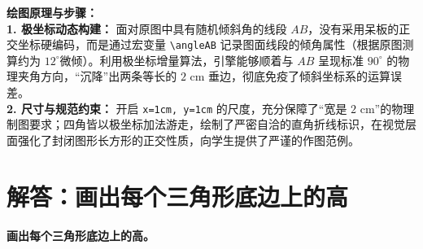 \vspace{0.4cm}
{\small\color{blue!70!black}
\textbf{绘图原理与步骤：}\\
\textbf{1. 极坐标动态构建：} 面对原图中具有随机倾斜角的线段 $AB$，没有采用呆板的正交坐标硬编码，而是通过宏变量 \texttt{\textbackslash angleAB} 记录图面线段的倾角属性（根据原图测算约为 $12^\circ$微倾）。利用极坐标增量算法，引擎能够顺着与 $AB$ 呈现标准 $90^\circ$ 的物理夹角方向，“沉降”出两条等长的 $2\text{ cm}$ 垂边，彻底免疫了倾斜坐标系的运算误差。\\
\textbf{2. 尺寸与规范约束：} 开启 \texttt{x=1cm, y=1cm} 的尺度，充分保障了“宽是 $2\text{ cm}$”的物理制图要求；四角皆以极坐标加法游走，绘制了严密自洽的直角折线标识，在视觉层面强化了封闭图形长方形的正交性质，向学生提供了严谨的作图范例。
}

\newpage




\section{解答：画出每个三角形底边上的高}

\vspace{0.4cm}

\noindent\textbf{画出每个三角形底边上的高。}

\vspace{0.8cm}

